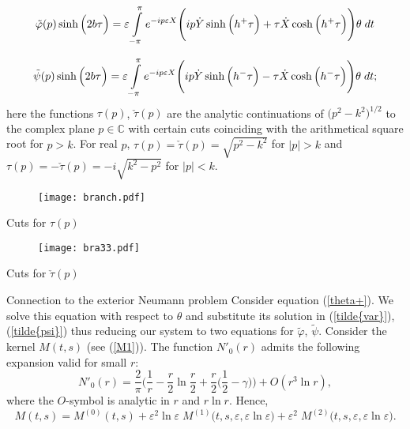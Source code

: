 \documentclass{beamer}
\newcommand{\ds}{\displaystyle}
\newcommand{\C}{\mathbb{C}}
\providecommand{\abs}[1]{\lvert#1\rvert}
\begin{document}
\begin{frame}

\begin{equation}\label{tilde{var}}
\begin{array}{lll}
\tilde{\varphi}(p)\sinh \Big(2b\tau\Big)= \varepsilon \ds\int\limits_{-\pi}^{\pi} e^{-ip\varepsilon X}\Bigg(ip\dot{Y}\sinh \Big(h^{+} \tau\Big)+\tau\dot{X}\cosh\Big(h^{+} \tau\Big)\Bigg)\theta\;dt
\end{array}
\end{equation}

\begin{equation}\label{tilde{psi}}
\begin{array}{lll}
\tilde{\psi}(p)\sinh \Big(2b\tau\Big)= \varepsilon \ds\int\limits_{-\pi}^{\pi} e^{-ip\varepsilon X}\Bigg(ip\dot{Y}\sinh \Big(h^{-} \tau\Big)-\tau\dot{X} \cosh\Big(h^{-}\tau\Big)\Bigg)\theta\;dt;
\end{array}
\end{equation}
here the functions $\tau(p)$, $\check{\tau}(p)$ are the analytic continuations of $\big(p^2-k^2\big)^{1/2}$ to the complex plane $p\in \C$ with certain cuts coinciding with the arithmetical square root for $p>k$.
For real $p$, $\tau(p)=\check{\tau}(p)=\sqrt{p^2-k^2}$ for $\abs{p}>k$ and  $\tau(p)=-\check{\tau}(p)=-i\sqrt{k^2-p^2}$ for $\abs{p}<k$. 

\end{frame}
\begin{frame}
\begin{figure}[htbp]
\centering
\texttt{[image: branch.pdf]}
\end{figure}
\centerline{Cuts for $\tau(p)$}
\end{frame}
\begin{frame}
\begin{figure}[htbp]
\centering
\texttt{[image: bra33.pdf]}
\end{figure}
\centerline{Cuts for $\check{\tau}(p)$}
\end{frame}
\begin{frame}{Connection to the exterior Neumann problem}
Consider equation (\ref{theta+}). We   solve this equation with respect to $\theta$ and substitute its solution in (\ref{tilde{var}}), (\ref{tilde{psi}}) thus reducing our system to two equations for $\tilde\varphi$, $\tilde\psi$. Consider the kernel $M(t,s)$ (see (\ref{M1})). The function $N'_0(r)$ admits the following  expansion valid for small $r$:   
\begin{equation*}
N'_0(r)=\ds\frac{2}{\pi}\Bigg(\ds\frac{1}{r}-\ds\frac{r}{2}\ln\ds\frac{r}{2}+\ds\frac{r}{2}\Big(\ds\frac{1}{2}-\gamma\Big)\Bigg)+O(r^3\ln r),
\end{equation*}
where the $O$-symbol is analytic in $r$ and $r\ln r$.
Hence, 
\begin{equation}\label{Mser}
M(t,s)=M^{(0)}(t,s)+\varepsilon^2\ln\varepsilon\; M^{(1)}\big(t,s,\varepsilon,\varepsilon\ln\varepsilon\big)+\varepsilon^2\; M^{(2)}\big(t,s,\varepsilon,\varepsilon\ln\varepsilon\big).
\end{equation}
\end{frame}
\end{document}
